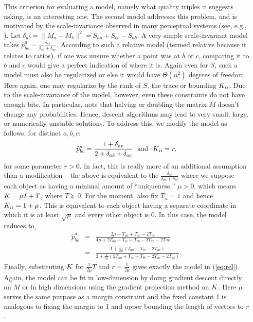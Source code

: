 \documentclass{article}
\begin{document}
This criterion for evaluating a model, namely what quality triples it suggests asking, is an interesting one.  The second model addresses this problem, and is motivated by the scale-invariance observed in many perceptual systems (see, e.g., \citealp{CB99}).  Let $\delta_{ab} = \|M_a-M_b\|^2=S_{aa}+S_{bb}-S_{ab}$.  A very simple scale-invariant model takes $\hat{p}^a_{bc} = \frac{\delta_{ac}}{\delta_{ab}+\delta_{ac}}$.  According to such a relative model (termed relative because it relates to ratios), if one was unsure whether a point was at $b$ or $c$, comparing it to $b$ and $c$ would give a perfect indication of where it is.  Again even for $S$, such a model must also be regularized or else it would have $\Theta(n^2)$ degrees of freedom.  Here again, one may regularize by the rank of $S$, the trace or bounding $\S_{ii}$.  Due to the scale-invariance of the model, however, even these constraints do not have enough bite.  In particular, note that halving or doubling the matrix $M$ doesn't change any probabilities.  Hence, descent algorithms may lead to very small, large, or numerically unstable solutions.  To address this, we modify the model as follows, for distinct $a,b,c$:
\begin{equation}
\label{eq:rel}
\hat{p}^a_{bc} =  \frac{1+\delta_{ac}}{2+\delta_{ab}+\delta_{ac}} \ \text{ and }\  \S_{ii}=r,
\end{equation}
for some parameter $r>0$.  In fact, this is really more of an additional assumption than a modification -- the above is equivalent to the $\frac{\delta_{ac}}{\delta_{ab}+\delta_{ac}}$ where we suppose each object as having a minimal amount of ``uniqueness,'' $\mu>0$, which means $\S = \mu I + T$, where $T \succeq 0$. For the moment, also fix $T_{ii}=1$ and hence $\S_{ii}=1+\mu$.  This is equivalent to each object having a separate coordinate in which it is at least $\sqrt{\mu}$ and every other object is 0.  In this case, the model reduces to,
\begin{eqnarray*}
\hat{p}^a_{bc} &=& \frac{2\mu + T_{aa}+T_{cc}-2T_{ac}}{4\mu+2T_{aa}+T_{cc}+T_{bb}-2T_{ab}-2T{ac}}\\
&=&\frac{1 + \frac{1}{2\mu}(T_{aa}+T_{cc}-2T_{ac})}{2 + \frac{1}{2\mu}(2T_{aa}+T_{cc}+T_{bb}-2T_{ac}-2T_{ab})}.
\end{eqnarray*}
Finally, substituting $\S$ for $\frac{1}{2\mu}T$ and $r=\frac{1}{2\mu}$ gives exactly the model in (\ref{eq:rel}).  Again, the model can be fit in low-dimension by doing gradient descent directly on $M$ or in high dimensions using the gradient projection method on $\S$.  Here $\mu$ serves the same purpose as a margin constraint and the fixed constant 1 is analogous to fixing the margin to 1 and upper bounding the length of vectors to $r$.
\end{document}
